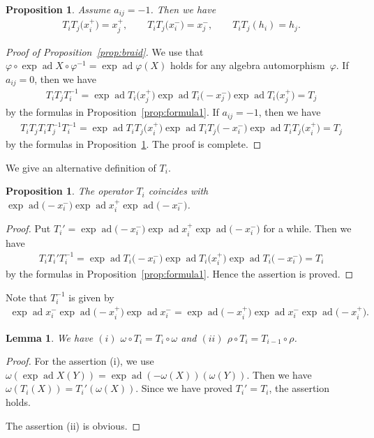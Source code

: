 \documentclass[11pt]{article}
\newtheorem{prop}[thm]{Proposition}
\newtheorem{lem}[thm]{Lemma}
\theoremstyle{definition}
\numberwithin{equation}{section}
\DeclareMathOperator{\ad}{ad}
\begin{document}
\begin{prop}\label{prop:iji_pre}Assume $a_{ij}=-1$. Then we have
\begin{gather*}
T_i T_j \big(x_i^+\big) = x_j^+,\qquad T_i T_j \big(x_i^-\big) = x_j^-,\qquad T_i T_j (h_i) = h_j.
\end{gather*}
\end{prop}

\begin{proof}[Proof of Proposition~\ref{prop:braid}] We use that $\varphi \circ \exp\ad X \circ \varphi^{-1} = \exp \ad \varphi(X)$ holds for any algebra automorphism~$\varphi$. If $a_{ij}=0$, then we have
\begin{gather*}
T_i T_j T_i^{-1} = \exp\ad T_i\big(x_j^+\big) \exp\ad T_i\big({-}x_j^-\big) \exp\ad T_i\big(x_j^+\big) = T_j
\end{gather*}
by the formulas in Proposition~\ref{prop:formula1}. If $a_{ij}=-1$, then we have
\begin{gather*}
T_i T_j T_i T_j^{-1} T_i^{-1} = \exp\ad T_i T_j \big(x_i^+\big) \exp\ad T_i T_j \big({-}x_i^-\big) \exp\ad T_i T_j \big(x_i^+\big) = T_j
\end{gather*}
by the formulas in Proposition~\ref{prop:iji_pre}. The proof is complete.
\end{proof}

We give an alternative definition of $T_i$.
\begin{prop}The operator $T_i$ coincides with $\exp\ad \big({-}x_i^{-}\big) \exp\ad x_i^{+} \exp\ad \big({-}x_i^{-}\big)$.
\end{prop}
\begin{proof}Put $T_i' = \exp\ad \big({-}x_i^{-}\big) \exp\ad x_i^{+} \exp\ad \big({-}x_i^{-}\big)$ for a while. Then we have
\begin{gather*}
T_i T_i' T_i^{-1} = \exp\ad T_i\big({-}x_i^{-}\big) \exp\ad T_i\big(x_i^+\big) \exp\ad T_i\big({-}x_i^{-}\big) = T_i
\end{gather*}
by the formulas in Proposition~\ref{prop:formula1}. Hence the assertion is proved.
\end{proof}

Note that $T_i^{-1}$ is given by
\begin{gather*}
\exp\ad x_i^- \exp\ad \big({-}x_i^+\big) \exp\ad x_i^- = \exp\ad \big({-}x_i^+\big) \exp\ad x_i^- \exp\ad \big({-}x_i^+\big).
\end{gather*}

\begin{lem}\label{lem:rho_omega_and_T} We have $(i)$ $\omega \circ T_i = T_{i} \circ \omega$ and $(ii)$ $\rho \circ T_i = T_{i-1} \circ \rho$.
\end{lem}
\begin{proof}For the assertion (i), we use $\omega (\exp\ad X (Y)) = \exp\ad(-\omega(X))(\omega(Y))$. Then we have $\omega(T_i(X))=T_i'(\omega(X))$. Since we have proved $T_i'=T_i$, the assertion holds.

The assertion (ii) is obvious.
\end{proof}
\end{document}
